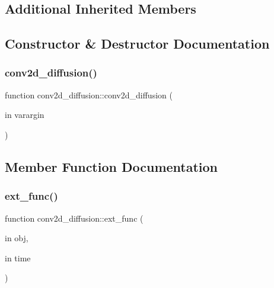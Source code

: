 \subsection*{Additional Inherited Members}


\subsection{Constructor \& Destructor Documentation}
\mbox{\label{classconv2d__diffusion_a8c9828aaa5100c1d3840086df0db40c0}} 
\subsubsection{\texorpdfstring{conv2d\+\_\+diffusion()}{conv2d\_diffusion()}}
{\footnotesize\ttfamily function conv2d\+\_\+diffusion\+::conv2d\+\_\+diffusion (\begin{DoxyParamCaption}\item[{in}]{varargin }\end{DoxyParamCaption})}



\subsection{Member Function Documentation}
\mbox{\label{classconv2d__diffusion_a193de0e494c2fb11dafce56b74c8d72e}} 
\subsubsection{\texorpdfstring{ext\+\_\+func()}{ext\_func()}}
{\footnotesize\ttfamily function conv2d\+\_\+diffusion\+::ext\+\_\+func (\begin{DoxyParamCaption}\item[{in}]{obj,  }\item[{in}]{time }\end{DoxyParamCaption})\hspace{0.3cm}{\ttfamily [private]}}



